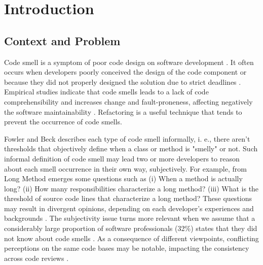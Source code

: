 \chapter{Introduction} 
\label{sec:introduction}

\section{Context and Problem}

Code smell is a symptom of poor code design on software development \cite{fowler1999refactoring}. It often occurs when developers poorly conceived the design of the code component or because they did not properly designed the solution due to strict deadlines \cite{palomba2014they}. Empirical studies indicate that code smells leads to a lack of code comprehensibility \cite{abbes2011empirical} and increases change and fault-proneness, affecting negatively the software maintainability \cite{yamashita2013exploring}. Refactoring \cite{fowler1999refactoring} is a useful technique that tends to prevent the occurrence of code smells.

Fowler and Beck \cite{fowler1999refactoring} describes each type of code smell informally, i. e., there aren't thresholds that objectively define when a class or method is "smelly" or not. Such informal definition of code smell may lead two or more developers to reason about each smell occurrence in their own way, subjectively. For example, from Long Method emerges some questions such as (i) When a method is actually long? (ii) How many responsibilities characterize a long method? (iii) What is the threshold of source code lines that characterize a long method? These questions may result in divergent opinions, depending on each developer's experiences and backgrounds \cite{hozano2018you}. The subjectivity issue turns more relevant when we assume that a considerably large proportion of software professionals (32\%) states that they did not know about code smells \cite{yamashita2013developers}. As a consequence of different viewpoints, conflicting perceptions on the same code bases may be notable, impacting the consistency across code reviews \cite{hozano2018you}.

